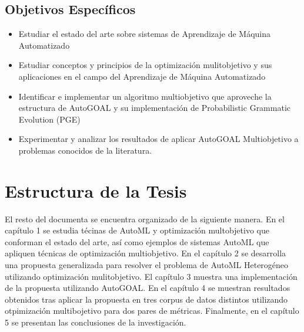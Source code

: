 \subsection*{Objetivos Espec\'ificos}
\begin{itemize}
    \item Estudiar el estado del arte sobre sistemas de Aprendizaje de M\'aquina Automatizado
    \item Estudiar conceptos y principios de la optimizaci\'on mulitobjetivo y sus aplicaciones en el campo del Aprendizaje de M\'aquina Automatizado
    \item Identificar e implementar un algoritmo multiobjetivo que aproveche la estructura de AutoGOAL y su implementaci\'on de Probabilistic Grammatic Evolution (PGE)
    \item Experimentar y analizar los resultados de aplicar AutoGOAL Multiobjetivo a problemas conocidos de la literatura.
\end{itemize}

\section*{Estructura de la Tesis}
El resto del documenta se encuentra organizado de la siguiente manera. En el cap\'itulo 1 se estudia t\'ecinas de AutoML y optimizaci\'on multobjetivo que conforman el estado del arte, as\'i como ejemplos de sistemas AutoML que apliquen t\'ecnicas de optimizaci\'on multiobjetivo. En el cap\'itulo 2 se desarrolla una propuesta generalizada para resolver el problema de AutoML Heterog\'eneo utilizando optimizaci\'on mulitobjetivo. El cap\'itulo 3 muestra una implementaci\'on de la propuesta utilizando AutoGOAL. En el cap\'itulo 4 se muestran resultados obtenidos tras aplicar la propuesta en tres corpus de datos distintos utilizando otpimizaci\'on multibojetivo para dos pares de m\'etricas. Finalmente, en el cap\'itulo 5 se presentan las conclusiones de la investigaci\'on.
